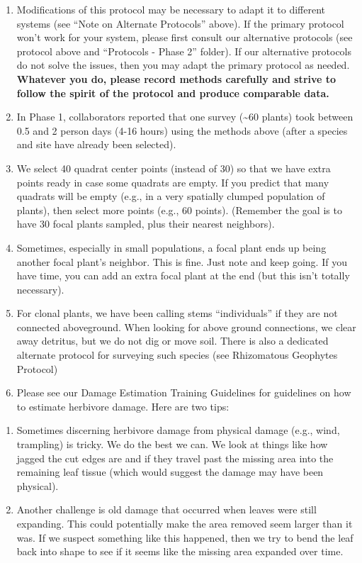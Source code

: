 \documentclass[
  letterpaper,
  DIV=11,
  numbers=noendperiod]{scrreprt}
\begin{document}
\begin{enumerate}
\def\labelenumi{\arabic{enumi}.}
\item
  Modifications of this protocol may be necessary to adapt it to
  different systems (see ``Note on Alternate Protocols'' above). If the
  primary protocol won't work for your system, please first consult our
  alternative protocols (see protocol above and ``Protocols - Phase 2''
  folder). If our alternative protocols do not solve the issues, then
  you may adapt the primary protocol as needed. \textbf{Whatever you do,
  please record methods carefully and strive to follow the spirit of the
  protocol and produce comparable data.}
\item
  In Phase 1, collaborators reported that one survey (\textasciitilde60
  plants) took between 0.5 and 2 person days (4-16 hours) using the
  methods above (after a species and site have already been selected).
\item
  We select 40 quadrat center points (instead of 30) so that we have
  extra points ready in case some quadrats are empty. If you predict
  that many quadrats will be empty (e.g., in a very spatially clumped
  population of plants), then select more points (e.g., 60 points).
  (Remember the goal is to have 30 focal plants sampled, plus their
  nearest neighbors).
\item
  Sometimes, especially in small populations, a focal plant ends up
  being another focal plant's neighbor. This is fine. Just note and keep
  going. If you have time, you can add an extra focal plant at the end
  (but this isn't totally necessary).
\item
  For clonal plants, we have been calling stems ``individuals'' if they
  are not connected aboveground. When looking for above ground
  connections, we clear away detritus, but we do not dig or move soil.
  There is also a dedicated alternate protocol for surveying such
  species (see Rhizomatous Geophytes Protocol)
\item
  Please see our Damage Estimation Training Guidelines for guidelines on
  how to estimate herbivore damage. Here are two tips:
\end{enumerate}

\begin{enumerate}
\def\labelenumi{\alph{enumi}.}
\item
  Sometimes discerning herbivore damage from physical damage (e.g.,
  wind, trampling) is tricky. We do the best we can. We look at things
  like how jagged the cut edges are and if they travel past the missing
  area into the remaining leaf tissue (which would suggest the damage
  may have been physical).
\item
  Another challenge is old damage that occurred when leaves were still
  expanding. This could potentially make the area removed seem larger
  than it was. If we suspect something like this happened, then we try
  to bend the leaf back into shape to see if it seems like the missing
  area expanded over time.
\end{enumerate}
\end{document}
